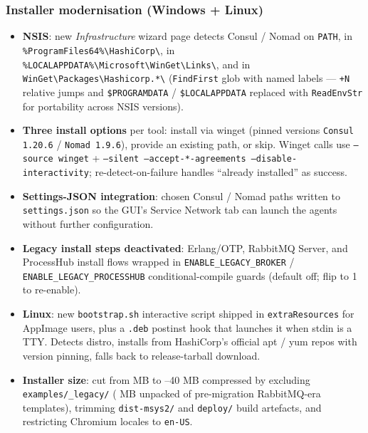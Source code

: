 \subsubsection{Installer modernisation (Windows + Linux)}

\begin{itemize}
   \item \textbf{NSIS}: new \emph{Infrastructure} wizard page detects Consul /
         Nomad on \texttt{PATH}, in \texttt{\%ProgramFiles64\%\textbackslash HashiCorp\textbackslash},
         in \texttt{\%LOCALAPPDATA\%\textbackslash Microsoft\textbackslash WinGet\textbackslash Links\textbackslash},
         and in \texttt{WinGet\textbackslash Packages\textbackslash Hashicorp.*\textbackslash}
         (\texttt{FindFirst} glob with named labels --- \texttt{+N} relative jumps
         and \texttt{\$PROGRAMDATA} / \texttt{\$LOCALAPPDATA} replaced with
         \texttt{ReadEnvStr} for portability across NSIS versions).
   \item \textbf{Three install options} per tool: install via winget (pinned
         versions \texttt{Consul 1.20.6} / \texttt{Nomad 1.9.6}), provide an
         existing path, or skip.  Winget calls use \texttt{--source winget} +
         \texttt{--silent --accept-*-agreements --disable-interactivity};
         re-detect-on-failure handles ``already installed'' as success.
   \item \textbf{Settings-JSON integration}: chosen Consul / Nomad paths
         written to \texttt{settings.json} so the GUI's Service Network tab
         can launch the agents without further configuration.
   \item \textbf{Legacy install steps deactivated}: Erlang/OTP, RabbitMQ
         Server, and ProcessHub install flows wrapped in
         \texttt{ENABLE\_LEGACY\_BROKER} / \texttt{ENABLE\_LEGACY\_PROCESSHUB}
         conditional-compile guards (default off; flip to 1 to re-enable).
   \item \textbf{Linux}: new \texttt{bootstrap.sh} interactive script shipped
         in \texttt{extraResources} for AppImage users, plus a \texttt{.deb}
         postinst hook that launches it when stdin is a TTY.  Detects distro,
         installs from HashiCorp's official apt / yum repos with version
         pinning, falls back to release-tarball download.
   \item \textbf{Installer size}: cut from  MB to --40 MB
         compressed by excluding \texttt{examples/\_legacy/} ( MB
         unpacked of pre-migration RabbitMQ-era templates), trimming
         \texttt{dist-msys2/} and \texttt{deploy/} build artefacts, and
         restricting Chromium locales to \texttt{en-US}.
\end{itemize}

